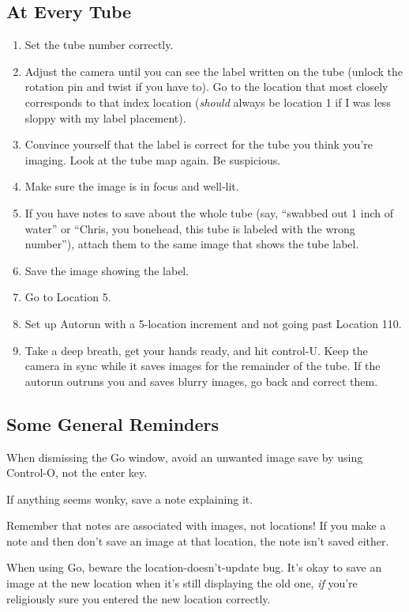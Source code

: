 \documentclass[11pt]{article}
\begin{document}
\subsection{At Every Tube}
	\begin{enumerate}
		\item{Set the tube number correctly.}
		\item{Adjust the camera until you can see the label written on the tube (unlock the rotation pin and twist if you have to). Go to the location that most closely corresponds to that index location (\textit{should} always be location 1 if I was less sloppy with my label placement).}
		\item{Convince yourself that the label is correct for the tube you think you're imaging. Look at the tube map again. Be suspicious.}
		\item{Make sure the image is in focus and well-lit.}
		\item{If you have notes to save about the whole tube (say, ``swabbed out 1 inch of water'' or ``Chris, you bonehead, this tube is labeled with the wrong number''), attach them to the same image that shows the tube label.}
		\item{Save the image showing the label.}
		\item{Go to Location 5.}
		\item{Set up Autorun with a 5-location increment and not going past Location 110.}
		\item{Take a deep breath, get your hands ready, and hit control-U. Keep the camera in sync while it saves images for the remainder of the tube. If the autorun outruns you and saves blurry images, go back and correct them.}
	\end{enumerate}	

\subsection{Some General Reminders}

	When dismissing the Go window, avoid an unwanted image save by using Control-O, not the enter key.
	
	If anything seems wonky, save a note explaining it.
	
	Remember that notes are associated with images, not locations! If you make a note and then don't save an image at that location, the note isn't saved either.
	
	When using Go, beware the location-doesn't-update bug. It's okay to save an image at the new location when it's still displaying the old one, \textit{if} you're religiously sure you entered the new location correctly.
	
\end{document}
